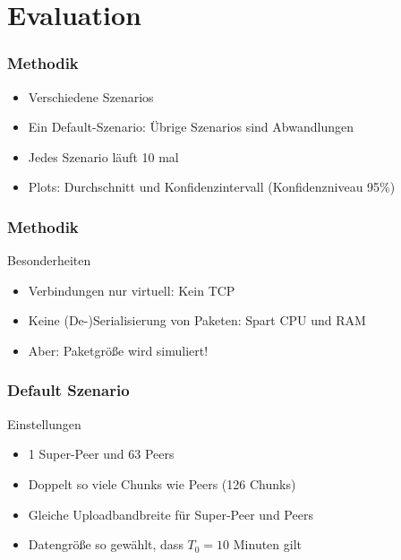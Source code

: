 \section{Evaluation}

\begin{frame}
  \frametitle{Methodik}
  \begin{itemize}  
  	\item Verschiedene Szenarios
    \item Ein Default-Szenario: Übrige Szenarios sind Abwandlungen
    \item Jedes Szenario läuft 10 mal
    \item Plots: Durchschnitt und Konfidenzintervall (Konfidenzniveau 95\%)
  \end{itemize}	
\end{frame}



\begin{frame}
  \frametitle{Methodik}
  \begin{block}{Besonderheiten}
    \begin{itemize}
      \item Verbindungen nur virtuell: Kein TCP
      \vspace{2mm}
      \item Keine (De-)Serialisierung von Paketen: Spart CPU und RAM
      \vspace{2mm}
      \item Aber: Paketgröße wird simuliert!
    \end{itemize}
  \end{block}
\end{frame}



\begin{frame}
  \frametitle{Default Szenario}
  \begin{block}{Einstellungen}
	  \begin{itemize}  
	    \item 1 Super-Peer und 63 Peers
	    \item Doppelt so viele Chunks wie Peers (126 Chunks)
	    \item Gleiche Uploadbandbreite für Super-Peer und Peers
	    \item Datengröße so gewählt, dass $T_0=10$ Minuten gilt 
	  \end{itemize}		
  \end{block}
\end{frame}


